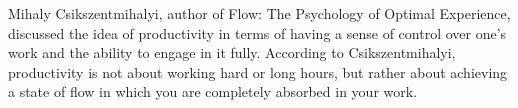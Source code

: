 




%

%



Mihaly Csikszentmihalyi, author of Flow: The Psychology of Optimal Experience, discussed the idea of productivity in terms of having a sense of control over one's work and the ability to engage in it fully. According to Csikszentmihalyi, productivity is not about working hard or long hours, but rather about achieving a state of flow in which you are completely absorbed in your work.





